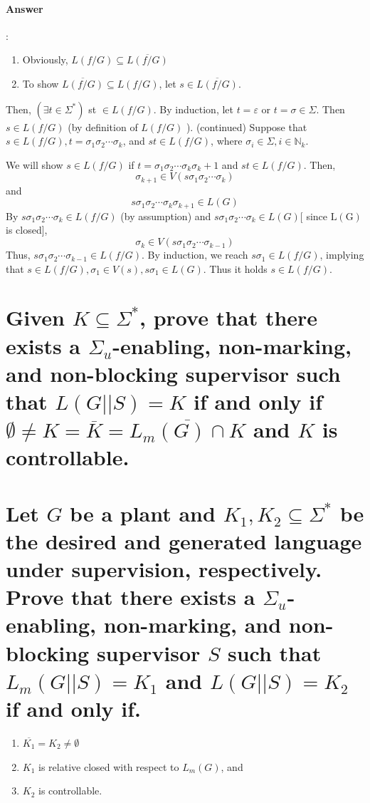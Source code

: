 \documentclass{article}
\begin{document}
\paragraph{Answer}:
\begin{enumerate}
  \item Obviously, $L(f/ G) \subseteq \overline{L(f/ G)}$
  \item To show $\overline{L(f/ G)} \subseteq L(f/ G)$, let $s \in \overline{L(f/ G)}$.
\end{enumerate}
Then, $\left(\exists t \in \Sigma^*\right)$ st $\in L(f/ G)$.
By induction, let $t=\varepsilon$ or $t=\sigma \in \Sigma$.
Then $s \in L(f/ G)$ (by definition of $L(f/ G)$ ).
(continued) Suppose that $s \in L(f/ G), t=\sigma_1 \sigma_2 \cdots \sigma_k$, and $s t \in L(f/ G)$, where $\sigma_i \in \Sigma, i \in \mathbb{N}_k$.

We will show $s \in L(f/ G)$ if $t=\sigma_1 \sigma_2 \cdots \sigma_k \sigma_k+1$ and $s t \in L(f/ G)$. Then,
$$
\sigma_{k+1} \in V\left(s \sigma_1 \sigma_2 \cdots \sigma_k\right)
$$
and
$$
s \sigma_1 \sigma_2 \cdots \sigma_k \sigma_{k+1} \in L(G)
$$
By $s \sigma_1 \sigma_2 \cdots \sigma_k \in L(f/ G)$ (by assumption) and $s \sigma_1 \sigma_2 \cdots \sigma_k \in L(G)[$ since $\mathrm{L}(\mathrm{G})$ is closed],
$$
\sigma_k \in V\left(s \sigma_1 \sigma_2 \cdots \sigma_{k-1}\right)
$$
Thus, $s \sigma_1 \sigma_2 \cdots \sigma_{k-1} \in L(f/ G)$. By induction, we reach $s \sigma_1 \in L(f/ G)$, implying that $s \in L(f/ G), \sigma_1 \in V(s), s \sigma_1 \in L(G)$. Thus it holds $s \in L(f/ G)$.



\section{Given $K \subseteq \Sigma^*$, prove that there exists a $\Sigma_u$-enabling, non-marking, and non-blocking supervisor such that $L(G||S) = K$ if and only if $\emptyset \neq  K = \overline{K} = \overline{L_m(G) \cap K} $ and $K$ is controllable.}


\section{Let $G$ be a plant and $K_1,K_2 \subseteq \Sigma^*$ be the desired and generated language under supervision, respectively. Prove that there exists a $\Sigma_u$-enabling, non-marking, and non-blocking supervisor $S$ such that $L_m(G||S) =K_1$ and $L(G||S) = K_2$ if and only if.}
\begin{enumerate}
  \item $\overline{K_1}=K_2 \neq \emptyset$
  \item $K_1$ is relative closed with respect to $L_m(G)$, and
  \item $K_2$ is controllable.
\end{enumerate}
\end{document}
